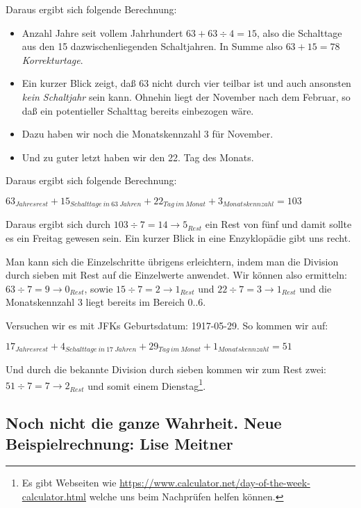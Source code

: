 \documentclass[version=last,paper=A4,fontsize=11pt,DIV=18]{scrartcl}
\begin{document}
Daraus ergibt sich folgende Berechnung:

\begin{itemize}
    \item Anzahl Jahre seit vollem Jahrhundert $63 + 63 \div 4 = 15$, also die Schalttage aus den 15 dazwischenliegenden Schaltjahren. In Summe also $63 + 15 = 78$ \emph{Korrekturtage}.
    \item Ein kurzer Blick zeigt, daß 63 nicht durch vier teilbar ist und auch ansonsten \emph{kein Schaltjahr} sein kann. Ohnehin liegt der November nach dem Februar, so daß ein potentieller Schalttag bereits einbezogen wäre.
    \item Dazu haben wir noch die Monatskennzahl 3 für November.
    \item Und zu guter letzt haben wir den 22. Tag des Monats.
\end{itemize}

Daraus ergibt sich folgende Berechnung:
\begin{center}
$63_{Jahresrest} + 15_{Schalttage\:in\:63\:Jahren} + 22_{Tag\:im\:Monat} + 3_{Monatskennzahl} = 103$
\end{center}

Daraus ergibt sich durch $103 \div 7 = 14 \rightarrow 5_{Rest}$ ein Rest von fünf und damit sollte es ein Freitag gewesen sein. Ein kurzer Blick in eine Enzyklopädie gibt uns recht.

Man kann sich die Einzelschritte übrigens erleichtern, indem man die Division durch sieben mit Rest auf die Einzelwerte anwendet. Wir können also ermitteln: $63 \div 7 = 9 \rightarrow 0_{Rest}$, sowie $15 \div 7 = 2 \rightarrow 1_{Rest}$ und $22 \div 7 = 3 \rightarrow 1_{Rest}$ und die Monatskennzahl 3 liegt bereits im Bereich $0..6$.

Versuchen wir es mit JFKs Geburtsdatum: 1917-05-29. So kommen wir auf:
\begin{center}
    $17_{Jahresrest} + 4_{Schalttage\:in\:17\:Jahren} + 29_{Tag\:im\:Monat} + 1_{Monatskennzahl} = 51$
\end{center}

Und durch die bekannte Division durch sieben kommen wir zum Rest zwei: $51 \div 7 = 7 \rightarrow 2_{Rest}$ und somit einem Dienstag\footnote{Es gibt Webseiten wie \url{https://www.calculator.net/day-of-the-week-calculator.html} welche uns beim Nachprüfen helfen können.}.

\subsection*{Noch nicht die ganze Wahrheit. Neue Beispielrechnung: Lise Meitner}
\end{document}
